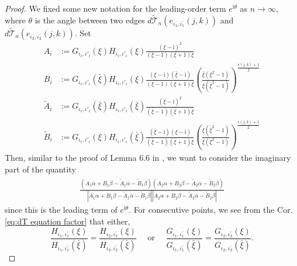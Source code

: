 \documentclass[12pt]{amsart}
\newcommand{\ci}{{\mathrm i}}
\newcommand{\io}{{\iota}}
\numberwithin{equation}{section}
\theoremstyle{definition}
\begin{document}
\begin{proof}
    We fixed some new notation for the leading-order term $e^{\ci \theta}$ as $n \to \infty$, where $\theta$ is the angle between two edges $d \widetilde{\mathcal{T}}_n\left(e_{\iota_1, \iota_1^{\prime}}(j, k)\right)$ and $d \widetilde{\mathcal{T}}_n\left(e_{\iota_2, \iota_2^{\prime}}(j, k)\right)$. Set
    \begin{equation}
        \begin{aligned}
             A_i&:=G_{\io_i, \io'_i}(\xi)H_{\io_i, \io'_i}(\xi)\frac{(\xi -\ci)^2}{(\xi -1)(\xi +1)\xi}\\
            B_i&:=G_{\io_i, \io'_i}(\bar \xi)H_{\io_i, \io'_i}(\xi)\frac{(\xi -\ci)(\bar \xi -\ci)}{(\xi -1)(\xi +1)\bar \xi}\left(\frac{\bar \xi (\xi^2-1)}{\xi(\bar \xi^2-1)}\right)^{\frac{\epsilon(j,k) +1}{2}}\\
            \widetilde A_i&:=G_{\io_i, \io'_i}(\bar \xi)H_{\io_i, \io'_i}(\bar \xi)\frac{(\bar \xi -\ci)^2}{(\bar \xi -1)(\bar \xi +1)\bar \xi}\\
            \widetilde B_i&:=G_{\io_i, \io'_i}(\xi)H_{\io_i, \io'_i}(\bar \xi)\frac{(\bar \xi -\ci)(\xi -\ci)}{(\bar \xi -1)(\bar \xi +1) \xi}\left(\frac{ \xi (\bar\xi^2-1)}{\bar\xi(\xi^2-1)}\right)^{\frac{\epsilon(j,k) +1}{2}}
        \end{aligned}
    \end{equation}
    Then, similar to the proof of Lemma 6.6 in \cite{tower_AD_perfect}, we want to consider the imaginary part of the quantity 
    \begin{equation}\label{eq: angle_leading_term}
        \begin{aligned}
            \frac{\overline{\left(A_1 \alpha+B_1 \beta-\widetilde{A}_1 \bar{\alpha}-\widetilde{B}_1 \bar{\beta}\right)}\left(A_2 \alpha+B_2 \beta-\widetilde{A}_2 \bar{\alpha}-\widetilde{B}_2 \bar{\beta}\right)}{\left|A_1 \alpha+B_1 \beta-\widetilde{A}_1 \bar{\alpha}-\widetilde{B}_1 \bar{\beta}\right|\left|A_2 \alpha+B_2 \beta-\widetilde{A}_2 \bar{\alpha}-\widetilde{B}_2 \bar{\beta}\right|}
        \end{aligned}
    \end{equation}
   since this is the leading term of $e^{\ci\theta}$. For consecutive points, we see from the Cor. \ref{eq:dT equation factor} that either,
$$
\frac{H_{\iota_1, \iota_1^{\prime}}(\xi)}{H_{\iota_1, \iota_1^{\prime}}(\bar{\xi})}=\frac{H_{\iota_2, \iota_2^{\prime}}(\xi)}{H_{\iota_2, \iota_2^{\prime}}(\bar{\xi})} \quad \text { or } \quad \frac{G_{\iota_1, \iota_1^{\prime}}(\xi)}{G_{\iota_1, \iota_1^{\prime}}(\bar{\xi})}=\frac{G_{\iota_2, \iota_2^{\prime}}(\xi)}{G_{\iota_2, \iota_2^{\prime}}(\bar{\xi})}.
$$
\end{proof}
\end{document}
